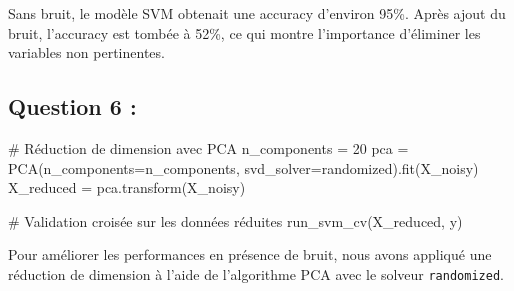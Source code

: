 \documentclass[
  letterpaper,
  DIV=11,
  numbers=noendperiod]{scrartcl}
\newenvironment{Shaded}{\begin{snugshade}}{\end{snugshade}}
\newcommand{\CommentTok}[1]{\textcolor[rgb]{0.37,0.37,0.37}{#1}}
\newcommand{\DecValTok}[1]{\textcolor[rgb]{0.68,0.00,0.00}{#1}}
\newcommand{\NormalTok}[1]{\textcolor[rgb]{0.00,0.23,0.31}{#1}}
\newcommand{\OperatorTok}[1]{\textcolor[rgb]{0.37,0.37,0.37}{#1}}
\newcommand{\StringTok}[1]{\textcolor[rgb]{0.13,0.47,0.30}{#1}}
\begin{document}
Sans bruit, le modèle SVM obtenait une accuracy d'environ 95\%. Après
ajout du bruit, l'accuracy est tombée à 52\%, ce qui montre l'importance
d'éliminer les variables non pertinentes.

\hypertarget{question-6}{%
\subsection{Question 6 :}\label{question-6}}

\begin{Shaded}
\begin{Highlighting}[]
\CommentTok{\# Réduction de dimension avec PCA}
\NormalTok{n\_components }\OperatorTok{=} \DecValTok{20}
\NormalTok{pca }\OperatorTok{=}\NormalTok{ PCA(n\_components}\OperatorTok{=}\NormalTok{n\_components, svd\_solver}\OperatorTok{=}\StringTok{\textquotesingle{}randomized\textquotesingle{}}\NormalTok{).fit(X\_noisy)}
\NormalTok{X\_reduced }\OperatorTok{=}\NormalTok{ pca.transform(X\_noisy)}

\CommentTok{\# Validation croisée sur les données réduites}
\NormalTok{run\_svm\_cv(X\_reduced, y)}
\end{Highlighting}
\end{Shaded}

Pour améliorer les performances en présence de bruit, nous avons
appliqué une réduction de dimension à l'aide de l'algorithme PCA avec le
solveur \texttt{randomized}.
\end{document}
